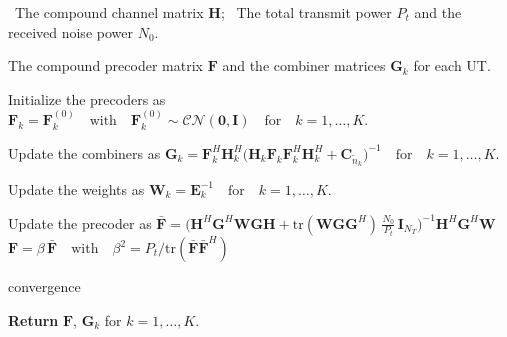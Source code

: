 \begin{algorithm}[!htbp]
\caption{\acs{WMMSE} Precoding}
\label{alg:wmmse_precoding}
\begin{algorithmic}[1]

    \Require
    \Statex \hspace{-\algorithmicindent} \textbullet \, The compound channel matrix $\mathbf{H}$;
    \Statex \hspace{-\algorithmicindent} \textbullet \, The total transmit power $P_t$ and the received noise power $N_0$.

    \Ensure The compound precoder matrix $\mathbf{F}$ and the combiner matrices $\mathbf{G}_k$ for each \ac{UT}.

    \medskip
    \State Initialize the precoders as
    \Statex $\mathbf{F}_k = \mathbf{F}_k^{(0)} \quad \text{with} \quad \mathbf{F}_k^{(0)} \sim \mathcal{CN}(\mathbf{0}, \mathbf{I}) \quad \text{for} \quad k = 1, \dots, K$.

    \vspace{0.2\baselineskip}
    \Repeat
        
        \vspace{0.2\baselineskip}
        \State Update the combiners as
        \Statex \hspace{\algorithmicindent} $\mathbf{G}_k = \mathbf{F}_k^H \mathbf{H}_k^H \big(\mathbf{H}_k \mathbf{F}_k \mathbf{F}_k^H \mathbf{H}_k^H + \mathbf{C}_{\tilde{n}_k}\big)^{-1} \quad \text{for} \quad k = 1, \dots, K.$

        \vspace{0.2\baselineskip}
        \State Update the weights as
        \Statex \hspace{\algorithmicindent} $\mathbf{W}_k = \mathbf{E}_k^{-1} \quad \text{for} \quad k = 1, \dots, K.$

        \vspace{0.2\baselineskip}
        \State Update the precoder as
        \Statex \hspace{\algorithmicindent} $\bar{\mathbf{F}} = \Big(\mathbf{H}^H \mathbf{G}^H \mathbf{W} \mathbf{G} \mathbf{H} + \mathrm{tr}(\mathbf{W} \mathbf{G} \mathbf{G}^H) \, \frac{N_0}{P_t} \, \mathbf{I}_{N_T}\Big)^{-1} \mathbf{H}^H \mathbf{G}^H \mathbf{W}$
        \Statex \hspace{\algorithmicindent} $\mathbf{F} = \beta \, \bar{\mathbf{F}} \quad \text{with} \quad \beta^2 = P_t / \mathrm{tr}(\bar{\mathbf{F}} \bar{\mathbf{F}}^H)$

    \vspace{0.2\baselineskip}
    \Until convergence

    \medskip
    \Statex \hspace{-\algorithmicindent}\textbf{Return} \; $\mathbf{F}$, \; $\mathbf{G}_k$ for $k = 1, \dots, K$.

\end{algorithmic}
\end{algorithm}

